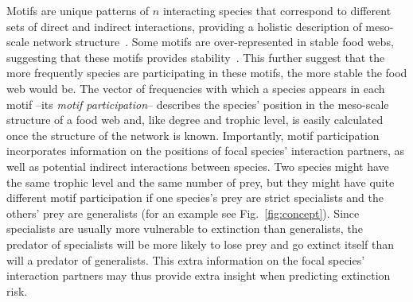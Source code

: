 \documentclass[12pt]{article}
\begin{document}
\begin{spacing}{2.0}
    
    Motifs are unique patterns of $n$ interacting species that correspond to different sets of direct and indirect interactions, providing a holistic description of meso-scale network structure~\citep{Stouffer2007,Stouffer2012}.
    Some motifs are over-represented in stable food webs, suggesting that these motifs provides stability~\citep{Borrelli2015a}. This further suggest that the more frequently species are participating in these motifs, the more stable the food web would be.
    The vector of frequencies with which a species appears in each motif --its \emph{motif participation}-- describes the species' position in the meso-scale structure of a food web and, like degree and trophic level, is easily calculated once the structure of the network is known.
    Importantly, motif participation incorporates information on the positions of focal species' interaction partners, as well as potential indirect interactions between species.
    Two species might have the same trophic level and the same number of prey, but they might have quite different motif participation if one species's prey are strict specialists and the others' prey are generalists (for an example see Fig.~\ref{fig:concept}).
    Since specialists are usually more vulnerable to extinction than generalists, the predator of specialists will be more likely to lose prey and go extinct itself than will a predator of generalists.
    This extra information on the focal species' interaction partners may thus provide extra insight when predicting extinction risk.
    

    



\end{spacing}
\end{document}
